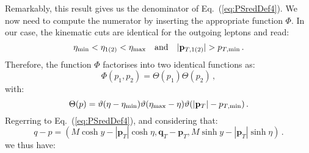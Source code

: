 \documentclass[10pt,a4paper]{article}
\begin{document}
Remarkably, this result gives us the denominator of
Eq.~(\ref{eq:PSredDef4}). We now need to compute the numerator by
inserting the appropriate function $\Phi$. In our case, the kinematic
cuts are identical for the outgoing leptons and read:
\begin{equation}
\eta_{\rm
  min} < \eta_{1(2)} < \eta_{\rm max}\quad\mbox{and}\quad |\mathbf{p}_{T,1(2)}| > p_{T,\rm min}\,.
\end{equation}
Therefore, the function $\Phi$ factorises into two identical functions
as:
\begin{equation}
\Phi(p_1,p_2) = \Theta(p_1)\Theta(p_2)\,,
\end{equation}
with:
\begin{equation}
  \Theta(p) = \vartheta(\eta - \eta_{\rm min})\vartheta(\eta_{\rm max}-\eta) \vartheta(|\mathbf{p}_{T}| - p_{T,\rm min}) \,. 
\end{equation}
Regerring to Eq.~(\ref{eq:PSredDef4}), and considering that:
\begin{equation}
q-p=\left(M\cosh y-|\mathbf{p}_T|\cosh\eta,\mathbf{q}_T-\mathbf{p}_T,M\sinh y-|\mathbf{p}_T|\sinh\eta\right)\,.
\end{equation}
we thus have:
\end{document}
